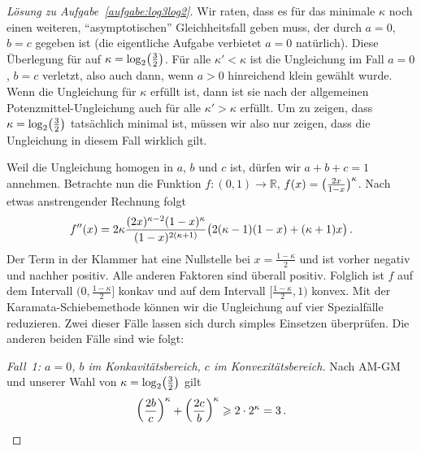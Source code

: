 \begin{proof}[Lösung zu Aufgabe~\ref{aufgabe:log3log2}]
	Wir raten, dass es für das minimale $\kappa$ noch einen weiteren, \enquote{asymptotischen} Gleichheitsfall geben muss, der durch $a=0$, $b=c$ gegeben ist (die eigentliche Aufgabe verbietet $a=0$ natürlich). Diese Überlegung für auf $\kappa=\log_2\parens[\big]{\frac32}$. Für alle $\kappa'<\kappa$ ist die Ungleichung im Fall $a=0$, $b=c$ verletzt, also auch dann, wenn $a>0$ hinreichend klein gewählt wurde. Wenn die Ungleichung für $\kappa$ erfüllt ist, dann ist sie nach der allgemeinen Potenzmittel-Ungleichung auch für alle $\kappa'>\kappa$ erfüllt. Um zu zeigen, dass $\kappa=\log_2\parens[\big]{\frac32}$ tatsächlich minimal ist, müssen wir also nur zeigen, dass die Ungleichung in diesem Fall wirklich gilt.
	
	Weil die Ungleichung homogen in $a$, $b$ und $c$ ist, dürfen wir $a+b+c=1$ annehmen. Betrachte nun die Funktion $f\colon (0,1)\rightarrow \mathbb R$, $f(x)=\parens[\big]{\frac{2x}{1-x}}^\kappa$. Nach etwas anstrengender Rechnung folgt
	\begin{equation*}
		f''(x)=2\kappa\frac{(2x)^{\kappa-2}(1-x)^{\kappa}}{(1-x)^{2(\kappa+1)}}\parens[\big]{2(\kappa-1)(1-x)+(\kappa+1)x}\,.
	\end{equation*}
	Der Term in der Klammer hat eine Nullstelle bei $x=\frac{1-\kappa}{2}$ und ist vorher negativ und nachher positiv. Alle anderen Faktoren sind überall positiv. Folglich ist $f$ auf dem Intervall $\bigl(0,\frac{1-\kappa}{2}\bigr]$ konkav und auf dem Intervall $\bigl[\frac{1-\kappa}{2},1\bigr)$ konvex. Mit der Karamata-Schiebemethode können wir die Ungleichung auf vier Spezialfälle reduzieren. Zwei dieser Fälle lassen sich durch simples Einsetzen überprüfen. Die anderen beiden Fälle sind wie folgt:
	
	\emph{Fall~1: $a=0$, $b$ im Konkavitätsbereich, $c$ im Konvexitätsbereich.} Nach AM-GM und unserer Wahl von $\kappa=\log_2\parens[\big]{\frac32}$ gilt
	\begin{equation*}
		\parens*{\frac{2b}{c}}^\kappa+\parens*{\frac{2c}{b}}^\kappa\geqslant 2\cdot 2^\kappa=3\,.
	\end{equation*}
	

\end{proof}
